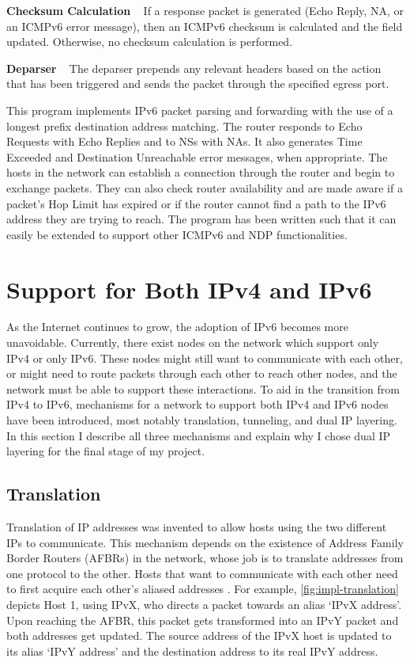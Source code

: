 \textbf{Checksum Calculation} ~ If a response packet is generated (Echo Reply, NA, or an ICMPv6 error message), then an ICMPv6 checksum is calculated and the field updated. Otherwise, no checksum calculation is performed.

\textbf{Deparser} ~ The deparser prepends any relevant headers based on the action that has been triggered and sends the packet through the specified egress port.

This program implements IPv6 packet parsing and forwarding with the use of a longest prefix destination address matching. The router responds to Echo Requests with Echo Replies and to NSs with NAs. It also generates Time Exceeded and Destination Unreachable error messages, when appropriate. The hosts in the network can establish a connection through the router and begin to exchange packets. They can also check router availability and are made aware if a packet's Hop Limit has expired or if the router cannot find a path to the IPv6 address they are trying to reach. The program has been written such that it can easily be extended to support other ICMPv6 and NDP functionalities.


\section{Support for Both IPv4 and IPv6}
\label{sec:3.8}

As the Internet continues to grow, the adoption of IPv6 becomes more unavoidable. Currently, there exist nodes on the network which support only IPv4 or only IPv6. These nodes might still want to communicate with each other, or might need to route packets through each other to reach other nodes, and the network must be able to support these interactions. To aid in the transition from IPv4 to IPv6, mechanisms for a network to support both IPv4 and IPv6 nodes have been introduced, most notably translation, tunneling, and dual IP layering. In this section I describe all three mechanisms and explain why I chose dual IP layering for the final stage of my project.

\subsection{Translation}
\label{sec:3.8.1}

Translation of IP addresses was invented to allow hosts using the two different IPs to communicate. This mechanism depends on the existence of Address Family Border Routers (AFBRs) in the network, whose job is to translate addresses from one protocol to the other. Hosts that want to communicate with each other need to first acquire each other's aliased addresses \cite{TransitionsPaper}. For example, \cref{fig:impl-translation} depicts Host 1, using IPvX, who directs a packet towards an alias `IPvX address'. Upon reaching the AFBR, this packet gets transformed into an IPvY packet and both addresses get updated. The source address of the IPvX host is updated to its alias `IPvY address' and the destination address to its real IPvY address.

